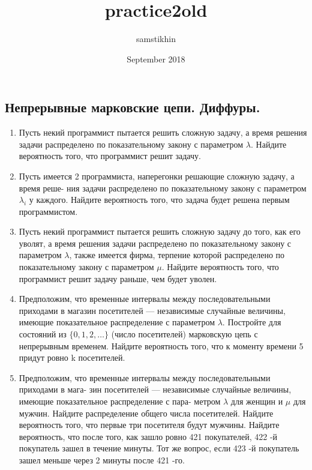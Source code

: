 \documentclass[a4paper, 14pt]{extarticle}
\title{practice2old}
\author{samstikhin}
\date{September 2018}
\begin{document}
\subsection*{Непрерывные марковские цепи. Диффуры.}
\begin{enumerate}
\item Пусть некий программист пытается решить сложную задачу, а время решения задачи
распределено по показательному закону с параметром $\lambda$. Найдите вероятность того, что программист
решит задачу.
\item Пусть имеется 2 программиста, наперегонки решающие сложную задачу, а время реше-
ния задачи распределено по показательному закону с параметром $\lambda_i$ у каждого. Найдите вероятность
того, что задача будет решена первым программистом.
\item Пусть некий программист пытается решить сложную задачу до того, как его уволят, а
время решения задачи распределено по показательному закону с параметром $\lambda$, также имеется фирма,
терпение которой распределено по показательному закону с параметром $\mu$. Найдите вероятность того,
что программист решит задачу раньше, чем будет уволен.

\item Предположим, что временные интервалы между последовательными приходами в магазин 
посетителей — независимые случайные величины, имеющие показательное распределение 
с параметром $\lambda$. Постройте для состояний из $\{0, 1, 2, \ldots \}$ (число посетителей) 
марковскую цепь с непрерывным временем. 
Найдите вероятность того, что к моменту времени 5 придут ровно k посетителей.

\item Предположим, что временные интервалы между последовательными приходами в мага-
зин посетителей — независимые случайные величины, имеющие показательное распределение с пара-
метром $\lambda$ для женщин и $\mu$ для мужчин. Найдите распределение общего числа посетителей. Найдите
вероятность того, что первые три посетителя будут мужчины. Найдите вероятность, что после того,
как зашло ровно 421 покупателей, 422 -й покупатель зашел в течение минуты. Тот же вопрос, если
423 -й покупатель зашел меньше через 2 минуты после 421 -го.


\end{enumerate}
\end{document}

